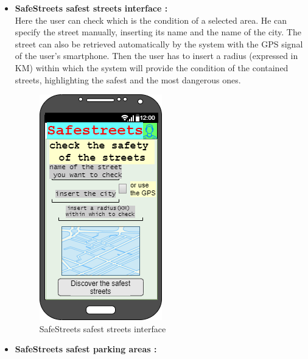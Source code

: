 \documentclass[titlepage]{article}
\begin{document}
\begin{itemize}
\begin{itemize}
	\newpage		
	
	
	

	
	
	\item \textbf{SafeStreets safest streets interface :}\\
		
	Here the user can check which is the condition of a selected area. He can specify the street manually, inserting its name and the name of the city. The street can also be retrieved automatically by the system with the GPS signal of the user's smartphone. Then the user has to insert a radius (expressed in KM) within which the system will provide the condition of the contained streets, highlighting the safest and the most dangerous ones.
	\begin{figure}[h]
	\includegraphics[scale=0.8]{Mockups/safest streets.png}
	\centering
	\caption{SafeStreets safest streets interface}
	\end{figure}
	\FloatBarrier
	
	\newpage		
	
	
	
	
	\item \textbf{SafeStreets safest parking areas :}\\
		

\end{itemize}
\end{itemize}
\end{document}

